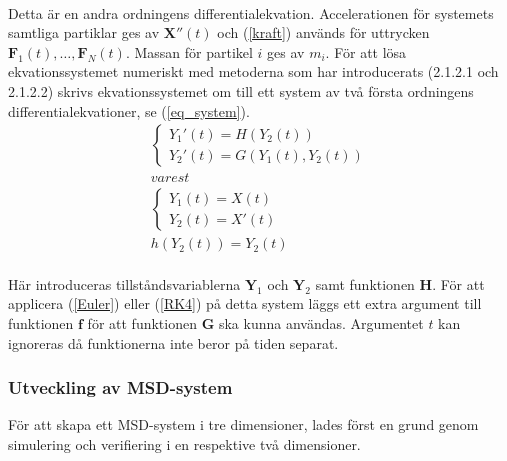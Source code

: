 \documentclass[a4paper,12pt,oneside,final,swedish]{extarticle}
\begin{document}
\\Detta är en andra ordningens differentialekvation. Accelerationen för systemets samtliga partiklar ges av \begin{math}\mathbf X''(t) \end{math} och (\ref{kraft}) används för uttrycken \begin{math}\mathbf F_1(t), …,\mathbf F_N(t) \end{math}. Massan för partikel $i$ ges av $m_i$. För att lösa ekvationssystemet numeriskt med metoderna som har introducerats (2.1.2.1 och 2.1.2.2) skrivs ekvationssystemet om till ett system av två första ordningens differentialekvationer, se (\ref{eq_system}).
\begin{equation}
\begin{split}
  \begin{cases}
    { Y }_{ 1 }'(t)=H(Y_{ 2 }(t))\\
    { Y }_{ 2 }'(t)=G(Y_{ 1 }(t),Y_{ 2 }(t))
  \end{cases}\\
  varest\\
  \begin{cases}
    { Y }_{ 1 }(t)=X(t)\\
    { Y }_{ 2 }(t)={ X }'(t)
  \end{cases}\\
  h(Y_{ 2 }(t))=Y_{ 2 }(t)
\end{split}
\label{eq_system}
\end{equation}
\\Här introduceras tillståndsvariablerna \begin{math}\mathbf Y_1 \end{math} och \begin{math}\mathbf Y_2 \end{math} samt funktionen \begin{math}\mathbf H \end{math}. För att applicera (\ref{Euler}) eller (\ref{RK4}) på detta system läggs ett extra argument till funktionen \begin{math}\mathbf f \end{math} för att funktionen \begin{math}\mathbf G \end{math} ska kunna användas. Argumentet $t$ kan ignoreras då funktionerna inte beror på tiden separat.

\subsubsection{Utveckling av MSD-system}
För att skapa ett MSD-system i tre dimensioner, lades först en grund genom simulering och verifiering i en respektive två dimensioner.
\end{document}
